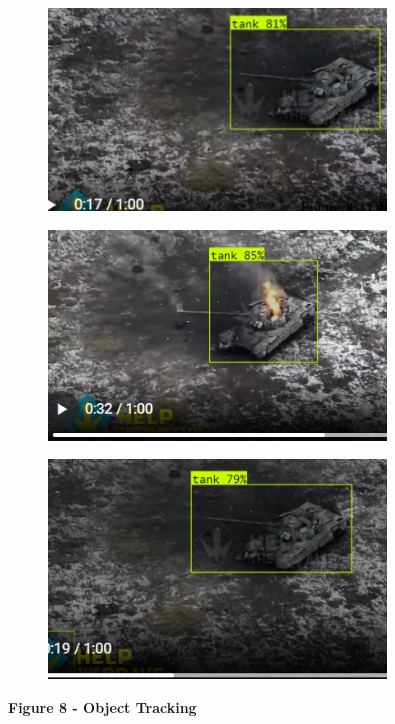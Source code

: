 \begin{figure}[H]
	\centering
	\includegraphics[width=0.8\textwidth]{assets/23}
	\caption*{}
\end{figure}\begin{figure}[H]
	\centering
	\includegraphics[width=0.8\textwidth]{assets/24}
	\caption*{}
\end{figure}\begin{figure}[H]
	\centering
	\includegraphics[width=0.8\textwidth]{assets/25}
	\caption*{}
\end{figure}

{\bfseries Figure 8 - Object Tracking}

